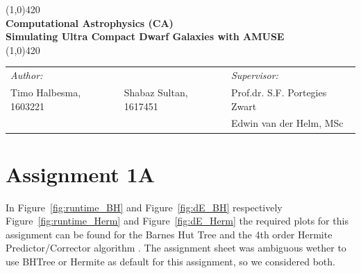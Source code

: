 \documentclass[a4paper]{article}
\begin{document}
\begin{center}
\line(1,0){420} \\
\huge \textbf{Computational Astrophysics (CA) \\
Simulating Ultra Compact Dwarf Galaxies with AMUSE} \\
\line(1,0){420}
\end{center}

\vfill



\begin{table}[h]
\begin{center}
\begin{tabular}{lp{5cm}l}
\textit{Author:} & & \emph{Supervisor:} \\
Timo Halbesma, 1603221 & Shabaz Sultan, 1617451 & Prof.dr. S.F. Portegies Zwart\\
& & Edwin van der Helm, MSc\\
\end{tabular}
\end{center}
\end{table}


\newpage

%

%

%

\section*{Assignment 1A}
In Figure~\ref{fig:runtime_BH} and Figure~\ref{fig:dE_BH} respectively
Figure~\ref{fig:runtime_Herm} and Figure~\ref{fig:dE_Herm} the required plots for this
assignment can be found for the Barnes Hut Tree \citep{1986Natur.324..446B} and the 4th order
Hermite Predictor/Corrector algorithm \citep{1995ApJ...443L..93H}. The assignment sheet was
ambiguous wether to use BHTree or Hermite as default for this assignment, so we
considered both.\\
\end{document}
